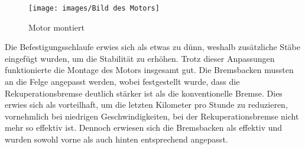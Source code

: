 \begin{figure}[h!]
    \centering
    \texttt{[image: images/Bild des Motors]}
    \caption{Motor montiert\cite{lorenz_scherrer_selbst_2023}}
    \label{fig:30}
\end{figure}


Die Befestigungsschlaufe erwies sich als etwas zu dünn, weshalb zusätzliche Stäbe eingefügt wurden, um die Stabilität zu erhöhen.
Trotz dieser Anpassungen funktionierte die Montage des Motors insgesamt gut.
Die Bremsbacken mussten an die Felge angepasst werden, wobei festgestellt wurde, dass die Rekuperationsbremse deutlich stärker ist als die konventionelle Bremse.
Dies erwies sich als vorteilhaft, um die letzten Kilometer pro Stunde zu reduzieren, vornehmlich bei niedrigen Geschwindigkeiten, bei der Rekuperationsbremse nicht mehr so effektiv ist.
Dennoch erwiesen sich die Bremsbacken als effektiv und wurden sowohl vorne als auch hinten entsprechend angepasst.
